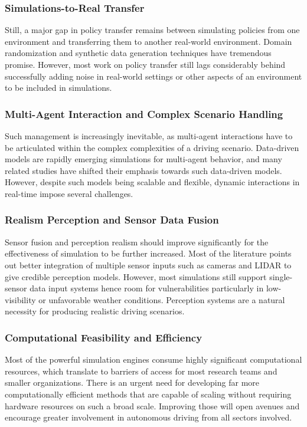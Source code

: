 \documentclass[lettersize,journal]{IEEEtran}
\begin{document}
\subsubsection{Simulations-to-Real Transfer}
Still, a major gap in policy transfer remains between simulating policies from one environment and transferring them to another real-world environment. Domain randomization and synthetic data generation techniques have tremendous promise. However, most work on policy transfer still lags considerably behind successfully adding noise in real-world settings or other aspects of an environment to be included in simulations.

\subsubsection{Multi-Agent Interaction and Complex Scenario Handling}
Such management is increasingly inevitable, as multi-agent interactions have to be articulated within the complex complexities of a driving scenario. Data-driven models are rapidly emerging simulations for multi-agent behavior, and many related studies have shifted their emphasis towards such data-driven models. However, despite such models being scalable and flexible, dynamic interactions in real-time impose several challenges.

\subsubsection{Realism Perception and Sensor Data Fusion}
Sensor fusion and perception realism should improve significantly for the effectiveness of simulation to be further increased. Most of the literature points out better integration of multiple sensor inputs such as cameras and LIDAR to give credible perception models. However, most simulations still support single-sensor data input systems hence room for vulnerabilities particularly in low-visibility or unfavorable weather conditions. Perception systems are a natural necessity for producing realistic driving scenarios.

\subsubsection{Computational Feasibility and Efficiency}
Most of the powerful simulation engines consume highly significant computational resources, which translate to barriers of access for most research teams and smaller organizations. There is an urgent need for developing far more computationally efficient methods that are capable of scaling without requiring hardware resources on such a broad scale. Improving those will open avenues and encourage greater involvement in autonomous driving from all sectors involved.
\end{document}
